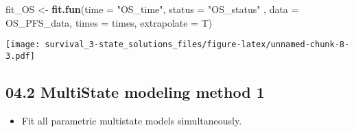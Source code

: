 \documentclass[
]{article}
\newenvironment{Shaded}{\begin{snugshade}}{\end{snugshade}}
\newcommand{\CommentTok}[1]{\textcolor[rgb]{0.56,0.35,0.01}{\textit{#1}}}
\newcommand{\DataTypeTok}[1]{\textcolor[rgb]{0.13,0.29,0.53}{#1}}
\newcommand{\KeywordTok}[1]{\textcolor[rgb]{0.13,0.29,0.53}{\textbf{#1}}}
\newcommand{\NormalTok}[1]{#1}
\newcommand{\OperatorTok}[1]{\textcolor[rgb]{0.81,0.36,0.00}{\textbf{#1}}}
\newcommand{\StringTok}[1]{\textcolor[rgb]{0.31,0.60,0.02}{#1}}
\providecommand{\tightlist}{%
  \setlength{\itemsep}{0pt}\setlength{\parskip}{0pt}}
\begin{document}
\begin{Shaded}
\begin{Highlighting}[]
\NormalTok{fit_OS   <-}\StringTok{ }\KeywordTok{fit.fun}\NormalTok{(}\DataTypeTok{time  =} \StringTok{"OS_time"}\NormalTok{, }\DataTypeTok{status  =} \StringTok{"OS_status"}\NormalTok{ , }\DataTypeTok{data =}\NormalTok{ OS_PFS_data, }
                    \DataTypeTok{times =}\NormalTok{ times, }\DataTypeTok{extrapolate =}\NormalTok{ T) }
\end{Highlighting}
\end{Shaded}

\texttt{[image: survival\_3-state\_solutions\_files/figure-latex/unnamed-chunk-8-3.pdf]}

\begin{Shaded}
\end{Shaded}

\hypertarget{multistate-modeling-method-1}{%
\subsection{04.2 MultiState modeling method
1}\label{multistate-modeling-method-1}}

\begin{itemize}
\tightlist
\item
  Fit all parametric multistate models simultaneously.
\end{itemize}
\end{document}
